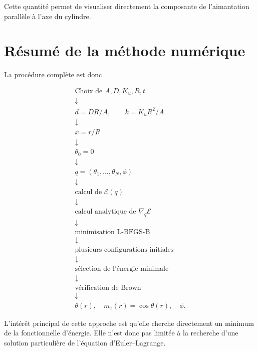 \documentclass[a4paper,11pt]{article}
\begin{document}
Cette quantité permet de visualiser directement la composante de
l'aimantation parallèle à l'axe du cylindre.

\section{Résumé de la méthode numérique}

La procédure complète est donc

\begin{equation}
\boxed{
\begin{array}{c}
\text{Choix de }A,D,K_u,R,t
\\[1mm]
\downarrow
\\[1mm]
d=DR/A,\qquad k=K_uR^2/A
\\[1mm]
\downarrow
\\[1mm]
x=r/R
\\[1mm]
\downarrow
\\[1mm]
\theta_0=0
\\[1mm]
\downarrow
\\[1mm]
q=(\theta_1,\ldots,\theta_N,\phi)
\\[1mm]
\downarrow
\\[1mm]
\text{calcul de }\mathcal E(q)
\\[1mm]
\downarrow
\\[1mm]
\text{calcul analytique de }\nabla_q\mathcal E
\\[1mm]
\downarrow
\\[1mm]
\text{minimisation L-BFGS-B}
\\[1mm]
\downarrow
\\[1mm]
\text{plusieurs configurations initiales}
\\[1mm]
\downarrow
\\[1mm]
\text{sélection de l'énergie minimale}
\\[1mm]
\downarrow
\\[1mm]
\text{vérification de Brown}
\\[1mm]
\downarrow
\\[1mm]
\theta(r),\quad
m_z(r)=\cos\theta(r),\quad
\phi.
\end{array}
}
\end{equation}

L'intérêt principal de cette approche est qu'elle cherche directement un
minimum de la fonctionnelle d'énergie. Elle n'est donc pas limitée à la
recherche d'une solution particulière de l'équation d'Euler--Lagrange.
\end{document}

